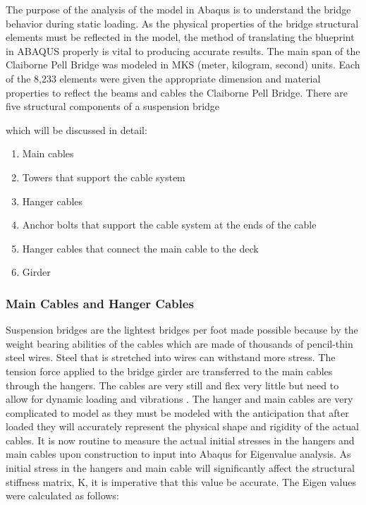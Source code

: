 The purpose of the analysis of the model in Abaqus is to understand the bridge behavior during static loading. As the physical properties of the bridge
structural elements must be reflected in the model, the method of translating the blueprint in ABAQUS properly is vital to producing accurate results.
The main span of the Claiborne Pell Bridge was modeled in MKS (meter, kilogram, second) units. Each of the 8,233 elements were given the appropriate
dimension and material properties to reflect the beams and cables the Claiborne Pell Bridge. There are five structural components of a suspension
bridge 

which will be discussed in detail:

\begin{enumerate}
\item Main cables
\item Towers that support the cable system
\item Hanger cables
\item Anchor bolts that support the cable system at the ends of the cable
\item Hanger cables that connect the main cable to the deck
\item Girder
\end{enumerate}

\subsubsection{Main Cables and Hanger Cables}

Suspension bridges are the lightest bridges per foot made possible because by the weight bearing abilities of the cables which are made of thousands of
pencil-thin steel wires. Steel that is stretched into wires can withstand more stress. The tension force applied to the bridge girder are transferred to
the main cables through the hangers. The cables are very still and flex very little but need to allow for dynamic loading and vibrations \cite{manoj}.
The hanger and main cables are very complicated to model as they must be modeled with the anticipation that after loaded they will accurately represent
the physical shape and rigidity of the actual cables. It is now routine to measure the actual initial stresses in the hangers and main cables upon
construction to input into Abaqus for Eigenvalue analysis. As initial stress in the hangers and main cable will significantly affect the structural
stiffness matrix, K, it is imperative that this value be accurate. The Eigen values were calculated as follows: 

